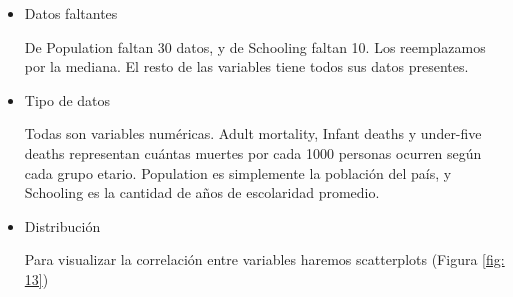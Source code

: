 \begin{itemize}
    \item Datos faltantes
    
    De Population faltan 30 datos, y de Schooling faltan 10. Los reemplazamos por la mediana. El resto de las variables tiene todos sus datos presentes.
    
    \item Tipo de datos
    
    Todas son variables numéricas. Adult mortality, Infant deaths y under-five deaths representan cuántas muertes por cada 1000 personas ocurren según cada grupo etario.  Population es simplemente la población del país, y Schooling es la cantidad de años de escolaridad promedio.
    
    \item Distribución
    
    Para visualizar la correlación entre variables haremos scatterplots (Figura \ref{fig: 13})
    

\end{itemize}
